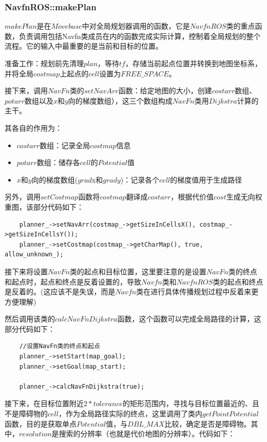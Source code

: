 \documentclass[9pt, oneside]{book}
\begin{document}
\subsubsection{NavfnROS::makePlan}

$makePlan$是在$Movebase$中对全局规划器调用的函数，它是$NavfnROS$类的重点函数，负责调用包括Navfn类成员在内的函数完成实际计算，控制着全局规划的整个流程。它的输入中最重要的是当前和目标的位置。

准备工作：规划前先清理$plan$，等待$tf$，存储当前起点位置并转换到地图坐标系，并将全局$costmap$上起点的$cell$设置为$FREE\_SPACE$。

接下来，调用$NavFn$类的$setNavArr$函数：给定地图的大小，创建$costarr$数组、$potarr$数组以及$x$和$y$向的梯度数组），这三个数组构成$NavFn$类用$Dijkstra$计算的主干。

其各自的作用为：

\begin{itemize}
    \item $costarr$数组：记录全局$costmap$信息
    \item $potarr$数组：储存各$cell$的$Potential$值
    \item $x$和$y$向的梯度数组($grad$x和$grady$)：记录各个$cell$的梯度值用于生成路径
\end{itemize}

另外，调用$setCostmap$函数将$costmap$翻译成$costarr$，根据代价值$cost$生成无向权重图，该部分代码如下：

\begin{verbatim}
    planner_->setNavArr(costmap_->getSizeInCellsX(), costmap_->getSizeInCellsY());
    planner_->setCostmap(costmap_->getCharMap(), true, allow_unknown_);
\end{verbatim}

接下来将设置$NavFn$类的起点和目标位置，这里要注意的是设置$NavFn$类的终点和起点时，起点和终点是反着设置的，导致$Navfn$类和$NavfnROS$类的起点和终点是反着的。(这应该不是失误，而是$Navfn$类在进行具体传播规划过程中反着来更方便理解)

然后调用该类的$calcNavFnDijkstra$函数，这个函数可以完成全局路径的计算，这部分代码如下：

\begin{verbatim}
    //设置NavFn类的终点和起点
    planner_->setStart(map_goal);
    planner_->setGoal(map_start);

    planner_->calcNavFnDijkstra(true);
\end{verbatim}

接下来，在目标位置附近$2*tolerance$的矩形范围内，寻找与目标位置最近的、且不是障碍物的$cell$，作为全局路径实际的终点，这里调用了类内$getPointPotential$函数，目的是获取单点$Potential$值，与$DBL\_MAX$比较，确定是否是障碍物。其中，$resolution$是搜索的分辨率（也就是代价地图的分辨率）。代码如下：
\end{document}
